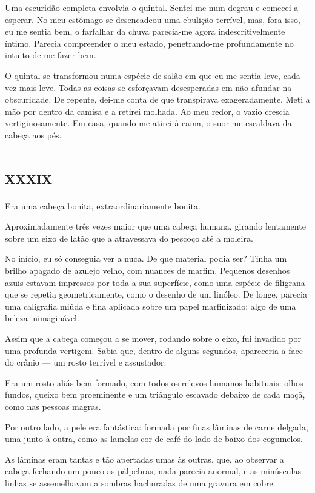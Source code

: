 Uma escuridão completa envolvia o quintal. Sentei-me num degrau e comecei a esperar. No meu estômago se desencadeou uma ebulição terrível, mas, fora isso, eu me sentia bem, o farfalhar da chuva parecia-me agora indescritivelmente íntimo. Parecia compreender o meu estado, penetrando-me profundamente no intuito de me fazer bem.

O quintal se transformou numa espécie de salão em que eu me sentia leve, cada vez mais leve. Todas as coisas se esforçavam desesperadas em não afundar na obscuridade. De repente, dei-me conta de que transpirava exageradamente. Meti a mão por dentro da camisa e a retirei molhada. Ao meu redor, o vazio crescia vertiginosamente. Em casa, quando me atirei à cama, o suor me escaldava da cabeça aos pés.


\chapter*{\huge\centering\textsc{xxxix}}

Era uma cabeça bonita, extraordinariamente bonita.

Aproximadamente três vezes maior que uma cabeça humana, girando lentamente sobre um eixo de latão que a atravessava do pescoço até a moleira. 

No início, eu só conseguia ver a nuca. De que material podia ser? Tinha um brilho apagado de azulejo velho, com nuances de marfim. Pequenos desenhos azuis estavam impressos por toda a sua superfície, como uma espécie de filigrana que se repetia geometricamente, como o desenho de um linóleo. De longe, parecia uma caligrafia miúda e fina aplicada sobre um papel marfinizado; algo de uma beleza inimaginável.

Assim que a cabeça começou a se mover, rodando sobre o eixo, fui invadido por uma profunda vertigem. Sabia que, dentro de alguns segundos, apareceria a face do crânio --- um rosto terrível e assustador.

Era um rosto aliás bem formado, com todos os relevos humanos habituais: olhos fundos, queixo bem proeminente e um triângulo escavado debaixo de cada maçã, como nas pessoas magras.

Por outro lado, a pele era fantástica: formada por finas lâminas de carne delgada, uma junto à outra, como as lamelas cor de café do lado de baixo dos cogumelos.

As lâminas eram tantas e tão apertadas umas às outras, que, ao observar a cabeça fechando um pouco as pálpebras, nada parecia anormal, e as minúsculas linhas se assemelhavam a sombras hachuradas de uma gravura em cobre.

